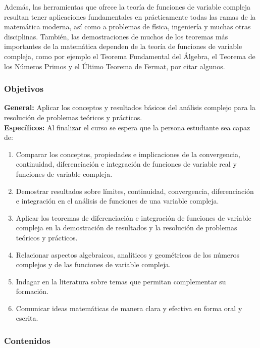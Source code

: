 \begin{refsection}
Además, las herramientas que ofrece la teoría de funciones de variable compleja resultan tener aplicaciones fundamentales en prácticamente todas las ramas de la matemática moderna, así como a problemas de física, ingeniería y muchas otras disciplinas. También, las demostraciones de muchos de los teoremas más importantes de la matemática dependen de la teoría de funciones de variable compleja, como por ejemplo el Teorema Fundamental del Álgebra, el Teorema de los Números Primos y el Último Teorema de Fermat, por citar algunos. 



\subsubsection*{Objetivos}

\textbf{General:} Aplicar los conceptos y resultados básicos del análisis complejo para la resolución de problemas teóricos y prácticos. \\

\textbf{Específicos:} Al finalizar el curso se espera que la persona estudiante sea capaz de:

\begin{enumerate}
\item Comparar los conceptos, propiedades e implicaciones de la convergencia, continuidad, diferenciación e integración de funciones de variable real y funciones de variable compleja.
\item Demostrar resultados sobre límites, continuidad, convergencia, diferenciación e integración en el análisis de funciones de una variable compleja.
\item Aplicar los teoremas de diferenciación e integración de funciones de variable compleja en la demostración de resultados y la resolución de problemas teóricos y prácticos.
\item Relacionar aspectos algebraicos, analíticos y geométricos de los números complejos y de las funciones de variable compleja.
\item Indagar en la literatura sobre temas que permitan complementar su formación.
\item Comunicar ideas matemáticas de manera clara y efectiva en forma oral y escrita.
\end{enumerate}

\subsubsection*{Contenidos}


\end{refsection}
